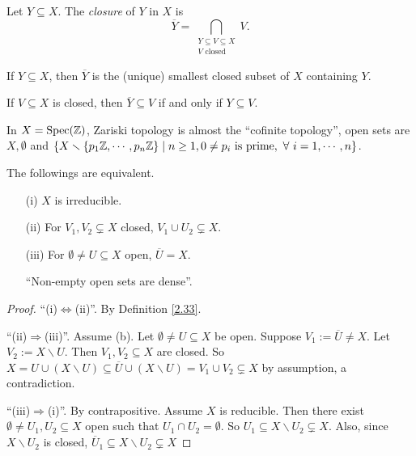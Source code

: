 \begin{definition}\label{2.36}
    Let $Y \subseteq X$. The \emph{closure} of $Y$ in $X$ is 
    \[\overbar Y = \bigcap_{\substack{Y \subseteq V \subseteq X \\ V \text{ closed}}}V.\]
\end{definition}

\begin{fact}\label{2.37}
    If $Y \subseteq X$, then $\overbar Y$ is the (unique) smallest closed subset of $X$ containing $Y$. \par 
    If $V \subseteq X$ is closed, then $\overbar Y \subseteq V$ if and only if $Y \subseteq V$.
\end{fact}

\begin{example*}
    In $X = \operatorname{Spec}(\mathbb{Z})$, Zariski topology is almost the ``cofinite topology'', open sets are $X,\emptyset$ and $\{X \smallsetminus \{p_1\mathbb{Z},\cdots,p_n\mathbb{Z}\} \mid n \geq 1, 0 \neq p_i \text{ is prime},\ \forall \  i = 1,\cdots,n\}$.
\end{example*}

\begin{lemma}\label{2.38}
    The followings are equivalent.
    \begin{enumerate}
        \item[(i)] $X$ is irreducible.
        \item[(ii)] For $V_1,V_2 \subsetneq X$ closed, $V_1 \cup U_2 \subsetneq X$.
        \item[(iii)] For $\emptyset \neq U \subseteq X$ open, $\overbar U = X$. \par 
            ``Non-empty open sets are dense''.
    \end{enumerate}
\end{lemma}

\begin{proof}
    ``(i)$\Leftrightarrow$(ii)''. By Definition \ref{2.33}. \par 
    ``(ii)$\Rightarrow$(iii)''. Assume (b). Let $\emptyset \neq U \subseteq X$ be open. Suppose $V_1 := \overbar U \neq X$. Let $V_2 := X \smallsetminus U$. Then $V_1,V_2 \subseteq X$ are closed. So $X = U \cup (X \smallsetminus U) \subseteq \overbar U \cup (X \smallsetminus U) = V_1 \cup V_2 \subsetneq X$ by assumption, a contradiction. \par 
    ``(iii)$\Rightarrow$(i)''. By contrapositive. Assume $X$ is reducible. Then there exist $\emptyset \neq U_1,U_2 \subseteq X$ open such that $U_1 \cap U_2 = \emptyset$. So $U_1 \subseteq X \smallsetminus U_2 \subsetneq X$. Also, since $X \smallsetminus U_2$ is closed, $\overbar U_1 \subseteq X \smallsetminus U_2 \subsetneq X$
\end{proof}

